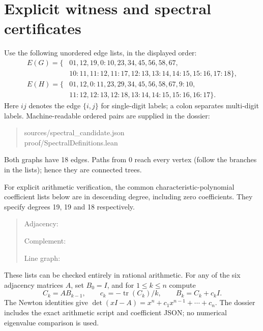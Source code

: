 \documentclass[11pt]{article}
\begin{document}
\section{Explicit witness and spectral certificates}
Use the following unordered edge lists, in the displayed order:
\begin{align*}
E(G)=\{&01,12,19,0\!:\!10,23,34,45,56,58,67,\\
       &10\!:\!11,11\!:\!12,11\!:\!17,12\!:\!13,13\!:\!14,14\!:\!15,15\!:\!16,17\!:\!18\},\\
E(H)=\{&01,12,0\!:\!11,23,29,34,45,56,58,67,9\!:\!10,\\
       &11\!:\!12,12\!:\!13,12\!:\!18,13\!:\!14,14\!:\!15,15\!:\!16,16\!:\!17\}.
\end{align*}
Here \(ij\) denotes the edge \(\{i,j\}\) for single-digit labels; a colon separates multi-digit labels. Machine-readable ordered pairs are supplied in the dossier:
\begin{quote}\small\ttfamily sources/spectral\_candidate.json\\
proof/SpectralDefinitions.lean\end{quote}
Both graphs have 18 edges. Paths from 0 reach every vertex (follow the branches in the lists); hence they are connected trees.

For explicit arithmetic verification, the common characteristic-polynomial coefficient lists below are in descending degree, including zero coefficients. They specify degrees 19, 19 and 18 respectively.
\begin{quote}\small\ttfamily
Adjacency:\newline
[1,0,-18,0,133,0,-522,0,1179,0,-1558,0,1177,0,\newline
-473,0,85,0,-4,0]\par
Complement:\par
Line graph:\newline
[1,0,-20,-6,161,88,-658,-484,1433,1242,-1637,\newline
-1542,937,892,-249,-212,24,14,-1]
\end{quote}
These lists can be checked entirely in rational arithmetic. For any of the six adjacency matrices \(A\), set \(B_0=I\), and for \(1\leq k\leq n\) compute
\[
 C_k=AB_{k-1},\qquad c_k=-\operatorname{tr}(C_k)/k,\qquad
 B_k=C_k+c_k I.
\]
The Newton identities give \(\det(xI-A)=x^n+c_1x^{n-1}+\cdots+c_n\).
The dossier includes the exact arithmetic script and coefficient JSON; no numerical eigenvalue comparison is used.
\end{document}
